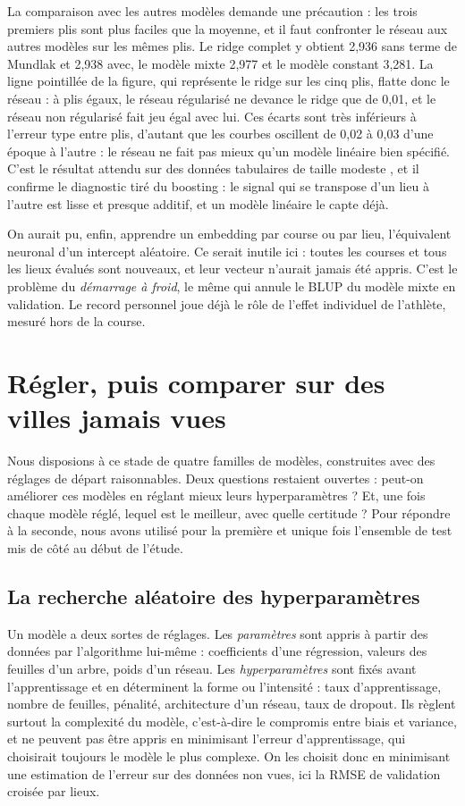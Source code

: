 \documentclass[11pt,a4paper]{article}
\begin{document}
La comparaison avec les autres modèles demande une précaution : les trois premiers plis sont plus faciles que la
moyenne, et il faut confronter le réseau aux autres modèles sur les mêmes plis. Le ridge complet y obtient 2,936 sans
terme de Mundlak et 2,938 avec, le modèle mixte 2,977 et le modèle constant 3,281. La ligne pointillée de la figure,
qui représente le ridge sur les cinq plis, flatte donc le réseau : à plis égaux, le réseau régularisé ne devance le
ridge que de 0,01, et le réseau non régularisé fait jeu égal avec lui. Ces écarts sont très inférieurs à l'erreur type
entre plis, d'autant que les courbes oscillent de 0,02 à 0,03 d'une époque à l'autre : le réseau ne fait pas mieux
qu'un modèle linéaire bien spécifié. C'est le résultat attendu sur des données tabulaires de taille modeste
\citep{grinsztajn2022}, et il confirme le diagnostic tiré du boosting : le signal qui se transpose d'un lieu à
l'autre est lisse et presque additif, et un modèle linéaire le capte déjà.

On aurait pu, enfin, apprendre un embedding par course ou par lieu, l'équivalent neuronal d'un intercept aléatoire.
Ce serait inutile ici : toutes les courses et tous les lieux évalués sont nouveaux, et leur vecteur n'aurait jamais
été appris. C'est le problème du \emph{démarrage à froid}, le même qui annule le BLUP du modèle mixte en validation.
Le record personnel joue déjà le rôle de l'effet individuel de l'athlète, mesuré hors de la course.

\section{Régler, puis comparer sur des villes jamais vues}\label{sec:comparaison}

Nous disposions à ce stade de quatre familles de modèles, construites avec des réglages de départ raisonnables. Deux
questions restaient ouvertes : peut-on améliorer ces modèles en réglant mieux leurs hyperparamètres ? Et, une fois
chaque modèle réglé, lequel est le meilleur, avec quelle certitude ? Pour répondre à la seconde, nous avons utilisé
pour la première et unique fois l'ensemble de test mis de côté au début de l'étude.

\subsection{La recherche aléatoire des hyperparamètres}\label{sec:recherche}

Un modèle a deux sortes de réglages. Les \emph{paramètres} sont appris à partir des données par l'algorithme lui-même :
coefficients d'une régression, valeurs des feuilles d'un arbre, poids d'un réseau. Les \emph{hyperparamètres} sont
fixés avant l'apprentissage et en déterminent la forme ou l'intensité : taux d'apprentissage, nombre de feuilles,
pénalité, architecture d'un réseau, taux de dropout. Ils règlent surtout la complexité du modèle, c'est-à-dire le
compromis entre biais et variance, et ne peuvent pas être appris en minimisant l'erreur d'apprentissage, qui
choisirait toujours le modèle le plus complexe. On les choisit donc en minimisant une estimation de l'erreur sur des
données non vues, ici la RMSE de validation croisée par lieux.
\end{document}
